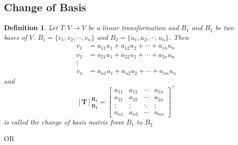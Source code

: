 \documentclass[a4paper, titlepage]{article}
\newtheorem{definition}{Definition}[section]
\begin{document}
    \subsection{Change of Basis}
        \begin{definition}
            Let $T: V \to V$ be a linear transformation and $B_1$ 
            and $B_2$ be two bases of $V$. $B_1 = \{ v_1, v_2, 
            \cdots, v_n \}$ and $B_2 = \{ u_1, u_2, \cdots, u_n \}$.
            Then 
            \begin{align*}
                v_1 &= a_{11}u_1 + a_{12}u_2 + \cdots + a_{1n}u_n \\
                v_2 &= a_{21}u_1 + a_{22}u_2 + \cdots + a_{2n}u_n \\
                \vdots \\
                v_n &= a_{n1}u_1 + a_{n2}u_2 + \cdots + a_{nn}u_n
            \end{align*}
            and
            $$
                \bm{[T]_{B_2}^{B_1}} = 
                        \begin{bmatrix}
                            a_{11} & a_{12} & \cdots & a_{1n} \\
                            a_{21} & a_{22} & \cdots & a_{2n} \\
                            \vdots & \vdots & \ddots & \vdots \\
                            a_{n1} & a_{n2} & \cdots & a_{nn}
                        \end{bmatrix} ^ \intercal
            $$ is called the change of basis matrix from $B_1$
            to $B_2$
        \end{definition}
        
        \begin{center}
            OR
        \end{center}
\end{document}
